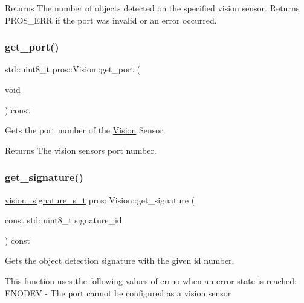 \begin{DoxyReturn}{Returns}
The number of objects detected on the specified vision sensor. Returns P\+R\+O\+S\+\_\+\+E\+RR if the port was invalid or an error occurred. 
\end{DoxyReturn}
\mbox{\label{classpros_1_1Vision_af9958688590139df7b1227765f63d5ce}} 
\subsubsection{\texorpdfstring{get\+\_\+port()}{get\_port()}}
{\footnotesize\ttfamily std\+::uint8\+\_\+t pros\+::\+Vision\+::get\+\_\+port (\begin{DoxyParamCaption}\item[{void}]{ }\end{DoxyParamCaption}) const}



Gets the port number of the \hyperlink{classpros_1_1Vision}{Vision} Sensor. 

\begin{DoxyReturn}{Returns}
The vision sensor\textquotesingle{}s port number. 
\end{DoxyReturn}
\mbox{\label{classpros_1_1Vision_af1d1bc18fd7dacfd23d9dfc403b7d419}} 
\subsubsection{\texorpdfstring{get\+\_\+signature()}{get\_signature()}}
{\footnotesize\ttfamily \hyperlink{vision_8h_a135c729c7277f6cc019c2924088a5fd5}{vision\+\_\+signature\+\_\+s\+\_\+t} pros\+::\+Vision\+::get\+\_\+signature (\begin{DoxyParamCaption}\item[{const std\+::uint8\+\_\+t}]{signature\+\_\+id }\end{DoxyParamCaption}) const}



Gets the object detection signature with the given id number. 

This function uses the following values of errno when an error state is reached\+: E\+N\+O\+D\+EV -\/ The port cannot be configured as a vision sensor


